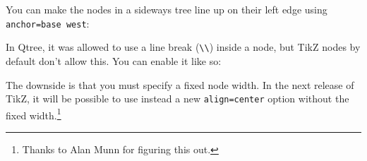 \documentclass{article}
\begin{document}
You can make the nodes in a sideways tree line up on their left edge using \verb|anchor=base west|:
\begin{center}
\begin{SideBySideExample}
\end{SideBySideExample}
\end{center}

In Qtree, it was allowed to use a line break (\verb|\\|) inside a node, but TikZ nodes by default don't allow this. You can enable it like so:
\begin{center}
\begin{SideBySideExample}
\end{SideBySideExample}
\end{center}
The downside is that you must specify a fixed node width. In the next release of TikZ, it will be possible to use instead a new \verb|align=center| option without the fixed width.\footnote{Thanks to Alan Munn for figuring this out.}
\end{document}
